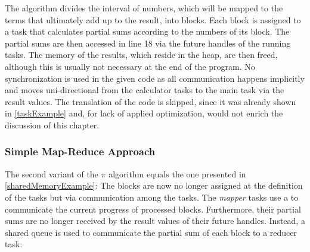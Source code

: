 The algorithm divides the interval of numbers, which will be mapped to the terms that ultimately add up to the result, into blocks. Each block is assigned to a task that calculates partial sums according to the numbers of its block. The partial sums are then accessed in line 18 via the future handles of the running tasks. The memory of the results, which reside in the heap, are then freed, although this is usually not necessary at the end of the program. No synchronization is used in the given code as all communication happens implicitly and moves uni-directional from the calculator tasks to the main task via the result values. The translation of the code is skipped, since it was already shown in \ref{taskExample} and, for lack of applied optimization, would not enrich the discussion of this chapter. 

\subsubsection{Simple Map-Reduce Approach}
\label{mapReduceApproach}
The second variant of the $\pi$ algorithm equals the one presented in \ref{sharedMemoryExample}: The blocks are now no longer assigned at the definition of the tasks but via communication among the tasks. The \textit{mapper} tasks use a  to communicate the current progress of processed blocks. Furthermore, their partial sums are no longer received by the result values of their future handles. Instead, a shared queue is used to communicate the partial sum of each block to a reducer task:

